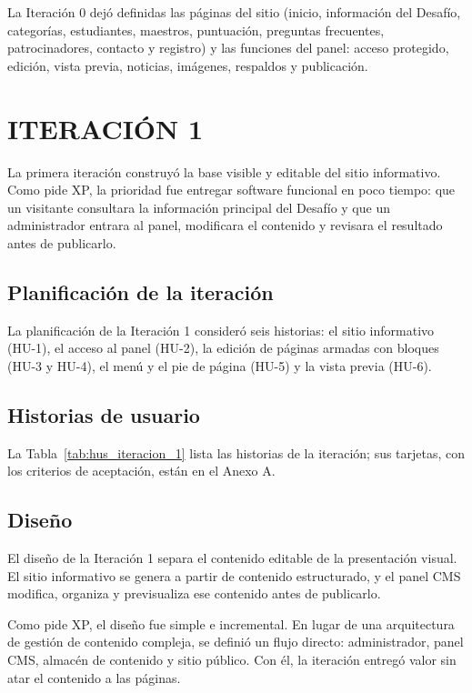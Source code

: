 La Iteración 0 dejó definidas las páginas del sitio (inicio, información del Desafío, categorías, estudiantes, maestros, puntuación, preguntas frecuentes, patrocinadores, contacto y registro) y las funciones del panel: acceso protegido, edición, vista previa, noticias, imágenes, respaldos y publicación.

\section{ITERACIÓN 1}

La primera iteración construyó la base visible y editable del sitio informativo. Como pide XP, la prioridad fue entregar software funcional en poco tiempo: que un visitante consultara la información principal del Desafío y que un administrador entrara al panel, modificara el contenido y revisara el resultado antes de publicarlo.

\subsection{Planificación de la iteración}

La planificación de la Iteración 1 consideró seis historias: el sitio informativo (HU-1), el acceso al panel (HU-2), la edición de páginas armadas con bloques (HU-3 y HU-4), el menú y el pie de página (HU-5) y la vista previa (HU-6).

\subsection{Historias de usuario}

La Tabla~\ref{tab:hus_iteracion_1} lista las historias de la iteración; sus tarjetas, con los criterios de aceptación, están en el Anexo A.




\subsection{Diseño}

El diseño de la Iteración 1 separa el contenido editable de la presentación visual. El sitio informativo se genera a partir de contenido estructurado, y el panel CMS modifica, organiza y previsualiza ese contenido antes de publicarlo.

Como pide XP, el diseño fue simple e incremental. En lugar de una arquitectura de gestión de contenido compleja, se definió un flujo directo: administrador, panel CMS, almacén de contenido y sitio público. Con él, la iteración entregó valor sin atar el contenido a las páginas.

